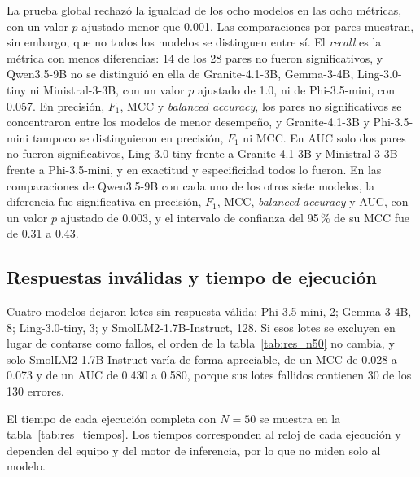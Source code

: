 La prueba global rechazó la igualdad de los ocho modelos en las ocho métricas, con un valor $p$ ajustado menor que 0.001. Las comparaciones por pares muestran, sin embargo, que no todos los modelos se distinguen entre sí. El \textit{recall} es la métrica con menos diferencias: 14 de los 28 pares no fueron significativos, y Qwen3.5-9B no se distinguió en ella de Granite-4.1-3B, Gemma-3-4B, Ling-3.0-tiny ni Ministral-3-3B, con un valor $p$ ajustado de 1.0, ni de Phi-3.5-mini, con 0.057. En precisión, $F_1$, MCC y \textit{balanced accuracy}, los pares no significativos se concentraron entre los modelos de menor desempeño, y Granite-4.1-3B y Phi-3.5-mini tampoco se distinguieron en precisión, $F_1$ ni MCC. En AUC solo dos pares no fueron significativos, Ling-3.0-tiny frente a Granite-4.1-3B y Ministral-3-3B frente a Phi-3.5-mini, y en exactitud y especificidad todos lo fueron. En las comparaciones de Qwen3.5-9B con cada uno de los otros siete modelos, la diferencia fue significativa en precisión, $F_1$, MCC, \textit{balanced accuracy} y AUC, con un valor $p$ ajustado de 0.003, y el intervalo de confianza del 95\,\% de su MCC fue de 0.31 a 0.43.

\subsection{Respuestas inválidas y tiempo de ejecución}

Cuatro modelos dejaron lotes sin respuesta válida: Phi-3.5-mini, 2; Gemma-3-4B, 8; Ling-3.0-tiny, 3; y SmolLM2-1.7B-Instruct, 128. Si esos lotes se excluyen en lugar de contarse como fallos, el orden de la tabla~\ref{tab:res_n50} no cambia, y solo SmolLM2-1.7B-Instruct varía de forma apreciable, de un MCC de 0.028 a 0.073 y de un AUC de 0.430 a 0.580, porque sus lotes fallidos contienen 30 de los 130 errores.

El tiempo de cada ejecución completa con $N = 50$ se muestra en la tabla~\ref{tab:res_tiempos}. Los tiempos corresponden al reloj de cada ejecución y dependen del equipo y del motor de inferencia, por lo que no miden solo al modelo.

